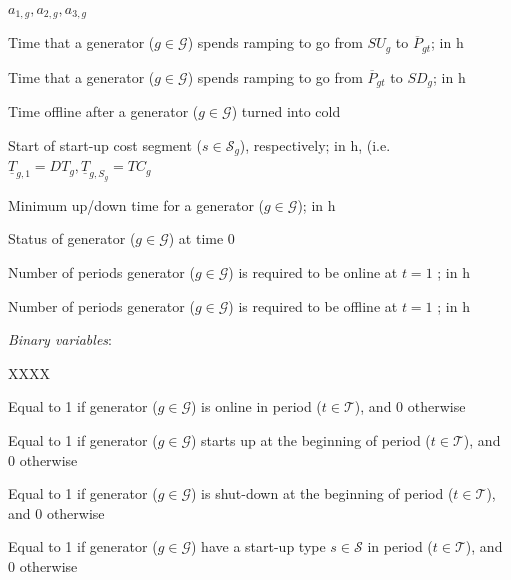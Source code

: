 \begin{labeling}{$a_{1,g},a_{2,g},a_{3,g}$}
\item[$T^{\text{RU}}_g$] Time that a generator ($g\in\mathcal{G}$) spends ramping to go from $\textit{SU}_{g}$ to $\overline{P}_{gt}$; in h
\item[$T^{\text{RD}}_g$] Time that a generator ($g\in\mathcal{G}$) spends ramping to go from $\overline{P}_{gt}$ to $SD_{g}$; in h
\item[$\textit{TC}_{g}$] Time offline after a generator ($g\in\mathcal{G}$) turned into cold
\item[$\underline{T}_{g,s}$] Start of start-up cost segment ($s\in\mathcal{S}_g$), respectively; in h, (i.e. $\underline{T}_{g,1}= DT_{g}, \underline{T}_{g,S_{g}}=\textit{TC}_{g}$
\item[$\textit{UT}_{g}$,$\textit{DT}_{g}$] Minimum up/down time for a generator ($g\in\mathcal{G}$); in h
\item[${u}_{g,0}$] Status of generator ($g\in\mathcal{G}$) at time 0
\item[$U_{g}$] Number of periods generator ($g\in\mathcal{G}$) is required to be online at $t=1$ ; in h
\item[$D_{g}$] Number of periods generator ($g\in\mathcal{G}$) is required to be offline at $t=1$ ; in h
\end{labeling}

\vspace{1em}
\noindent\textit{Binary variables}:%
\begin{labeling}{XXXX}
\setlength\itemsep{0.1em}
\item[${u}_{gt}$] Equal to 1 if generator ($g\in\mathcal{G}$) is online in period ($t\in\mathcal{T}$), and 0 otherwise 
\item[$v_{gt}$] Equal to 1 if generator ($g\in\mathcal{G}$) starts up at the beginning of period ($t\in\mathcal{T}$), and 0 otherwise
\item[$w_{gt}$] Equal to 1 if generator ($g\in\mathcal{G}$) is shut-down at the beginning of period ($t\in\mathcal{T}$), and 0 otherwise
\item[$\delta_{gts}$] Equal to 1 if generator ($g\in\mathcal{G}$) have a start-up type $s \in \mathcal{S}$ in period ($t\in\mathcal{T}$), and 0 otherwise 
\end{labeling}

